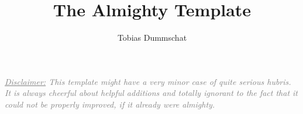 \documentclass[11pt]{book}
\title{The Almighty Template}
\author{Tobias Dummschat}
\newcommand\1{\mathds{1}}
\newcommand\ul\underline
\theoremstyle{definition}
\numberwithin{equation}{chapter}
\begin{document}
{\let\newpage\relax\maketitle}

\it{\textcolor{gray}{\ul{Disclaimer:} This template might have a very minor case of quite serious hubris. It is always cheerful about helpful additions and totally ignorant to the fact that it could not be properly improved, if it already were almighty.}}
\end{document}
